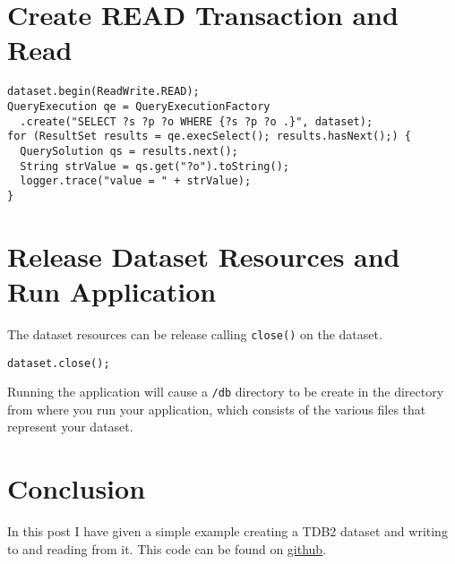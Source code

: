 \documentclass{amsart}
\begin{document}
  \section{Create READ Transaction and Read}
  \begin{small}
  \begin{verbatim}
dataset.begin(ReadWrite.READ);
QueryExecution qe = QueryExecutionFactory
  .create("SELECT ?s ?p ?o WHERE {?s ?p ?o .}", dataset);
for (ResultSet results = qe.execSelect(); results.hasNext();) {
  QuerySolution qs = results.next();
  String strValue = qs.get("?o").toString();
  logger.trace("value = " + strValue);
}   
  \end{verbatim} 
  \end{small}
  
  \section{Release Dataset Resources and Run Application}
  The dataset resources can be release calling \texttt{close()} on the dataset.  
  \begin{small}
   \begin{verbatim}
dataset.close();
   \end{verbatim}
  \end{small}
  
  Running the application will cause a \texttt{/db} directory to be create in the directory from where you run your application, which consists of the various files that represent your dataset. 
  
  \section{Conclusion}
  In this post I have given a simple example creating a TDB2 dataset and writing to and reading from it. This code can be found on \href{https://github.com/henrietteharmse/henrietteharmse/blob/master/blog/tutorial/jena/source/tdb/src/main/java/org/jena/tdb/tutorial/TDBCreateWriteRead.java}{github}.
  

  

  
  
  
  
 
\end{document}
